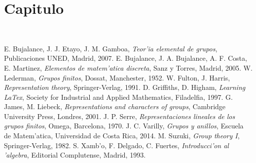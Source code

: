 \documentclass[a4paper,openright,12pt]{report}
\numberwithin{equation}{section} %
\begin{document}
\chapter{Capitulo}
\newpage
$\ $
\thispagestyle{empty}
\begin{thebibliography}{9}
 E. Bujalance, J. J. Etayo, J. M. Gamboa, \emph{Teor'ia elemental de grupos}, Publicaciones UNED, Madrid, 2007.
 E. Bujalance, J. A. Bujalance, A. F. Costa, E. Martinez, \emph{Elementos de matem'atica discreta}, Sanz y Torres, Madrid, 2005.
 W. Lederman, \emph{Grupos finitos}, Dossat, Manchester, 1952.
 W. Fulton, J. Harris, \emph{Representation theory}, Springer-Verlag, 1991.
 D. Griffiths, D. Higham, \emph{Learning LaTex}, Society for Industrial and Applied Mathematics, Filadelfia, 1997.
 G. James, M. Liebeck, \emph{Representations and characters of groups}, Cambridge University Press, Londres, 2001.
 J. P. Serre, \emph{Representaciones lineales de los grupos finitos}, Omega, Barcelona, 1970.
 J. C. Varilly, \emph{Grupos y anillos}, Escuela de Matem'atica, Universidad de Costa Rica, 2014. 
 M. Suzuki, \emph{Group theory I}, Springer-Verlag, 1982. 
 S. Xamb'o, F. Delgado, C. Fuertes, \emph{Introducci'on al 'algebra}, Editorial Complutense, Madrid, 1993.
\end{thebibliography}
\end{document}
